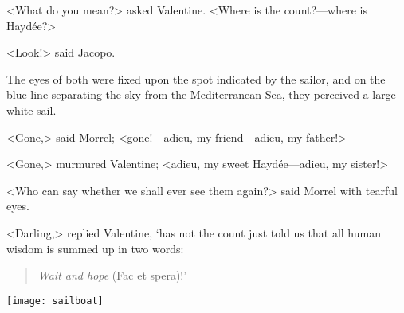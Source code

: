  <What do you mean?> asked Valentine. <Where is the count?—where is Haydée?> 

 <Look!> said Jacopo. 

 The eyes of both were fixed upon the spot indicated by the sailor, and on the blue line separating the sky from the Mediterranean Sea, they perceived a large white sail. 

 <Gone,> said Morrel; <gone!—adieu, my friend—adieu, my father!> 

 <Gone,> murmured Valentine; <adieu, my sweet Haydée—adieu, my sister!> 

 <Who can say whether we shall ever see them again?> said Morrel with tearful eyes. 

 <Darling,> replied Valentine, `has not the count just told us that all human wisdom is summed up in two words: 

\begin{quote}
\textit{Wait and hope} (Fac et spera)!'
\end{quote}

\vfill
\centerline{\texttt{[image: sailboat]}}
\vfill